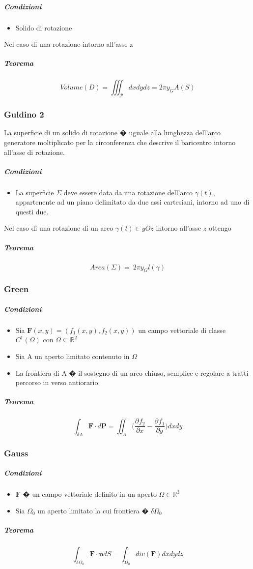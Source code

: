 \documentclass[10pt,a4paper]{report}
\newcommand{\pdv}[3]{\frac{\partial^{#2} #1}{\partial #3^{#2}}}
\begin{document}
			\subparagraph{Condizioni}
				\begin{itemize}
					\item Solido di rotazione 	 
				\end{itemize}
			Nel caso di una rotazione intorno all'asse z	
			\subparagraph{Teorema}		
			\[ Volume(D) = \iiint_{\mathcal{P}}dxdydz = 2\pi y_{G} A(S) \]
			
			\subsubsection{Guldino 2}
			La superficie di un solido di rotazione � uguale alla lunghezza dell'arco generatore moltiplicato per la circonferenza che descrive il baricentro intorno all'asse di rotazione.
			
			\subparagraph{Condizioni}
				\begin{itemize}
					\item La superficie $ \Sigma $ deve essere data da una rotazione dell'arco $ \gamma(t)  $, appartenente ad un piano delimitato da due assi cartesiani, intorno ad uno di questi due.
				\end{itemize}
			Nel caso di una rotazione di un arco $ \gamma(t) \in yOz $ intorno all'asse $ z $ ottengo	
			
			\subparagraph{Teorema}		
			\[ Area(\Sigma) = \ 2\pi y_{G} l(\gamma) \]
			
			\subsubsection{Green}
				\subparagraph{Condizioni}
					\begin{itemize}
						\item Sia $ \mathbf{F}(x,y) = (f_{1}(x,y),f_{2}(x,y)) $ un campo vettoriale di classe $C^{1} (\Omega)$ con $\Omega \subseteq \mathbb{R}^{2}$
						\item Sia A un aperto limitato contenuto in $ \Omega $
						\item La frontiera di A � il sostegno di un arco chiuso, semplice e regolare a tratti percorso in verso antiorario.
					\end{itemize}
			
			\subparagraph{Teorema}
			
			\[ \int_{\delta A} \mathbf{F} \cdot d \mathbf{P} = \iint_{A} \Big(\pdv{f_{2}}{}{x} - \pdv{f_{1}}{}{y}\Big) dxdy \]
			
			
			\subsubsection{Gauss}
				\subparagraph{Condizioni}
					\begin{itemize}
						\item $ \mathbf{F} $ � un campo vettoriale definito in un aperto $ \Omega \in \mathbb{R}^{3} $
						\item Sia $ \Omega_{0} $ un aperto limitato la cui frontiera � $ \delta \Omega_{0} $
					\end{itemize}
				\subparagraph{Teorema}
				\[ \int_{\delta \Omega_{0}} \mathbf{F} \cdot \mathbf{n} dS = \int_{\Omega_{0}} div(\mathbf{F}) dxdydz \]
			
\end{document}
